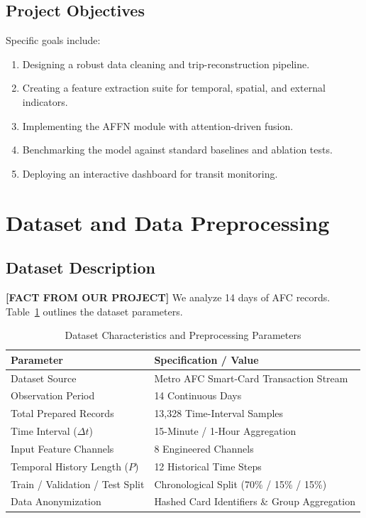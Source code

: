 \documentclass[conference]{IEEEtran}
\begin{document}
\subsection{Project Objectives}
\noindent Specific goals include:
\begin{enumerate}
    \item Designing a robust data cleaning and trip-reconstruction pipeline.
    \item Creating a feature extraction suite for temporal, spatial, and external indicators.
    \item Implementing the AFFN module with attention-driven fusion.
    \item Benchmarking the model against standard baselines and ablation tests.
    \item Deploying an interactive dashboard for transit monitoring.
\end{enumerate}

\section{Dataset and Data Preprocessing}
\label{sec:dataset}

\subsection{Dataset Description}
\noindent \textbf{[FACT FROM OUR PROJECT]} We analyze 14 days of AFC records. Table~\ref{tab:dataset_stats} outlines the dataset parameters.

\begin{table}[htbp]
\caption{Dataset Characteristics and Preprocessing Parameters}
\label{tab:dataset_stats}
\centering
\begin{tabular}{ll}
\toprule
\textbf{Parameter} & \textbf{Specification / Value} \\
\midrule
Dataset Source & Metro AFC Smart-Card Transaction Stream \\
Observation Period & 14 Continuous Days \\
Total Prepared Records & 13,328 Time-Interval Samples \\
Time Interval ($\Delta t$) & 15-Minute / 1-Hour Aggregation \\
Input Feature Channels & 8 Engineered Channels \\
Temporal History Length ($P$) & 12 Historical Time Steps \\
Train / Validation / Test Split & Chronological Split (70\% / 15\% / 15\%) \\
Data Anonymization & Hashed Card Identifiers \& Group Aggregation \\
\bottomrule
\end{tabular}
\end{table}
\end{document}
